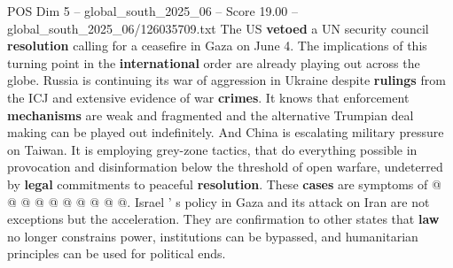\begin{textsample}{POS Dim 5 – global\_south\_2025\_06 – Score 19.00 – global\_south\_2025\_06/126035709.txt}
The US \textbf{vetoed} a UN security council \textbf{resolution} calling for a ceasefire in Gaza on June 4.
The implications of this turning point in the \textbf{international} order are already playing out across the globe.
Russia is continuing its war of aggression in Ukraine despite \textbf{rulings} from the ICJ and extensive evidence of war \textbf{crimes}.
It knows that enforcement \textbf{mechanisms} are weak and fragmented and the alternative Trumpian deal making can be played out indefinitely.
And China is escalating military pressure on Taiwan.
It is employing grey-zone tactics, that do everything possible in provocation and disinformation below the threshold of open warfare, undeterred by \textbf{legal} commitments to peaceful \textbf{resolution}.
These \textbf{cases} are symptoms of @ @ @ @ @ @ @ @ @ @.
Israel ' s policy in Gaza and its attack on Iran are not exceptions but the acceleration.
They are confirmation to other states that \textbf{law} no longer constrains power, institutions can be bypassed, and humanitarian principles can be used for political ends.

\end{textsample}
